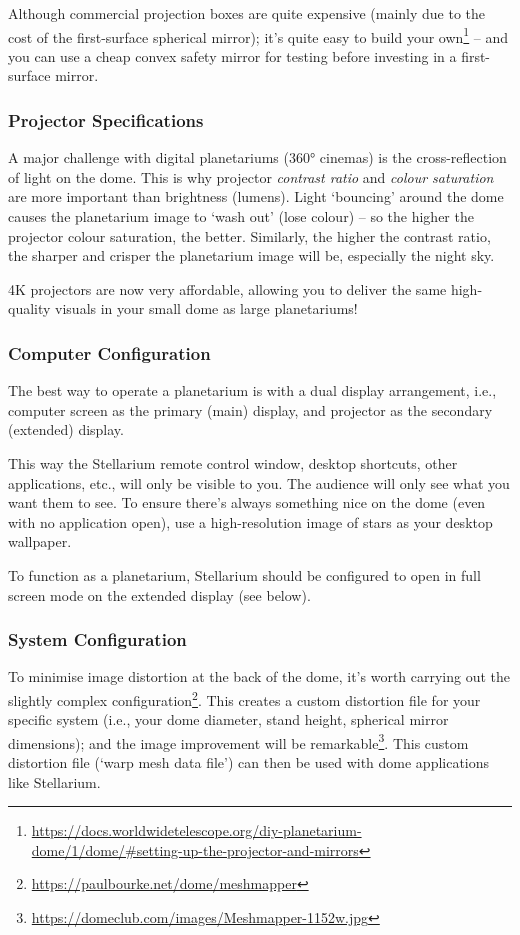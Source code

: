 Although commercial projection boxes are quite expensive (mainly due to the cost of the first-surface spherical mirror); 
it's quite easy to build your 
own\footnote{\url{https://docs.worldwidetelescope.org/diy-planetarium-dome/1/dome/#setting-up-the-projector-and-mirrors}} 
-- and you can use a cheap convex safety mirror for testing before investing in a first-surface mirror.

\subsubsection{Projector Specifications}
A major challenge with digital planetariums (360° cinemas) is the cross-reflection of light on the dome. 
This is why projector \emph{contrast ratio} and \emph{colour saturation} are more important than brightness (lumens). 
Light `bouncing' around the dome causes the planetarium image to `wash out' (lose colour) -- 
so the higher the projector colour saturation, the better. 
Similarly, the higher the contrast ratio, the sharper and crisper the planetarium image will be, especially the night sky.

4K projectors are now very affordable, allowing you to deliver the same high-quality visuals in your small
dome as large planetariums!

\subsubsection{Computer Configuration}
The best way to operate a planetarium is with a dual display arrangement, i.e., 
computer screen as the primary (main) display, and projector as the secondary (extended) display.

This way the Stellarium remote control window, desktop shortcuts, other applications, etc., will only be visible
to you. The audience will only see what you want them to see. To ensure there’s always something nice on
the dome (even with no application open), use a high-resolution image of stars as your desktop wallpaper.

To function as a planetarium, Stellarium should be configured to open in full screen mode on the extended
display (see below).

\subsubsection{System Configuration}
To minimise image distortion at the back of the dome, it’s worth carrying out the slightly complex
 configuration\footnote{\url{https://paulbourke.net/dome/meshmapper}}. 
This creates a custom distortion file for your specific system (i.e., your dome
diameter, stand height, spherical mirror dimensions); 
and the image improvement will be remarkable\footnote{\url{https://domeclub.com/images/Meshmapper-1152w.jpg}}. 
This custom distortion file (‘warp mesh data file’) can then be used with dome applications like Stellarium.


